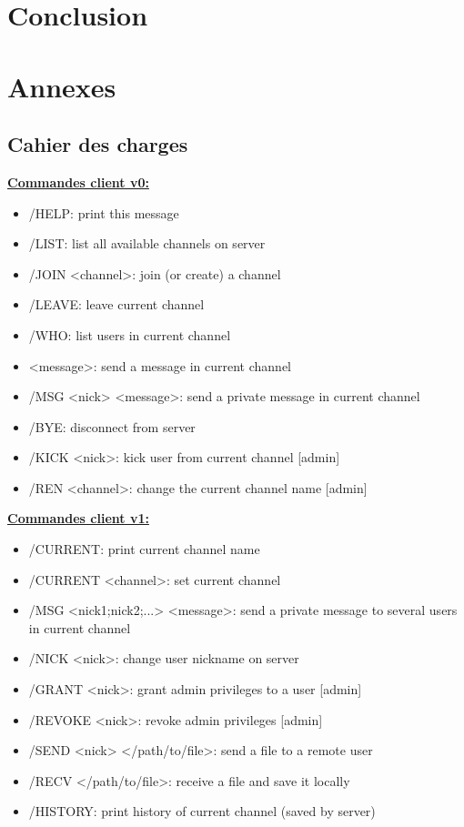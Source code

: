 \documentclass[12pt]{article}
\begin{document}
\section{Conclusion}




\section{Annexes}
\subsection{Cahier des charges}
{\large \textbf{\underline{Commandes client v0:}}}
\begin{itemize}
    \item /HELP: print this message
    \item /LIST: list all available channels on server
    \item /JOIN <channel>: join (or create) a channel
    \item /LEAVE: leave current channel
    \item /WHO: list users in current channel
    \item <message>: send a message in current channel
    \item /MSG <nick> <message>: send a private message in current channel
    \item /BYE: disconnect from server
    \item /KICK <nick>: kick user from current channel [admin]
    \item /REN <channel>: change the current channel name [admin]
\end{itemize}

{\large \textbf{\underline{Commandes client v1:}}}
\begin{itemize}
    \item /CURRENT: print current channel name
\item /CURRENT <channel>: set current channel
\item /MSG <nick1;nick2;...> <message>: send a private message to several users in current channel
\item /NICK <nick>: change user nickname on server
\item /GRANT <nick>: grant admin privileges to a user [admin]
\item /REVOKE <nick>: revoke admin privileges [admin]
\item /SEND <nick> </path/to/file>: send a file to a remote user
\item /RECV </path/to/file>: receive a file and save it locally
\item /HISTORY: print history of current channel (saved by server)
\end{itemize}
\end{document}

